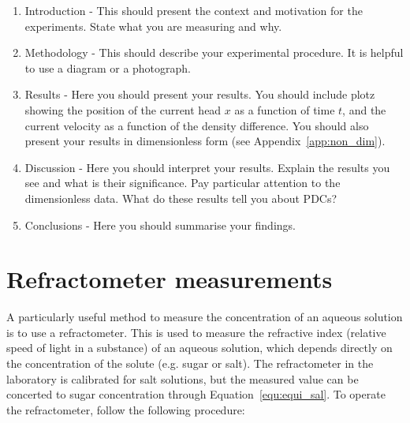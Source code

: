 \documentclass[]{article}
\theoremstyle{definition}
\begin{document}
\begin{enumerate}
\item Introduction - This should present the context and motivation for the experiments. State what you are measuring and why.
\item Methodology - This should describe your experimental procedure. It is helpful to use a diagram or a photograph.
\item Results - Here you should present your results. You should include plotz showing the position of the current head $x$ as a function of time $t$, and the current velocity as a function of the density difference. You should also present your results in dimensionless form (see Appendix~\ref{app:non_dim}).
\item Discussion - Here you should interpret your results. Explain the results you see and what is their significance. Pay particular attention to the dimensionless data. What do these results tell you about PDCs?
\item Conclusions - Here you should summarise your findings.
\end{enumerate}

\appendix

\section{Refractometer measurements}
\label{app:refract}

A particularly useful method to measure the concentration of an aqueous solution is to use a refractometer. This is used to measure the refractive index (relative speed of light in a substance) of an aqueous solution, which depends directly on the concentration of the solute (e.g. sugar or salt). The refractometer in the laboratory is calibrated for salt solutions, but the measured value can be concerted to sugar concentration through Equation~\ref{equ:equi_sal}. To operate the refractometer, follow the following procedure:
\end{document}
